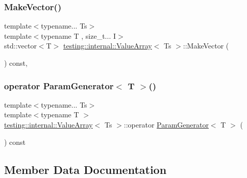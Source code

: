 \subsubsection{\texorpdfstring{Make\+Vector()}{MakeVector()}}
{\footnotesize\ttfamily template$<$typename... Ts$>$ \\
template$<$typename T , size\+\_\+t... I$>$ \\
std\+::vector$<$T$>$ \hyperlink{classtesting_1_1internal_1_1ValueArray}{testing\+::internal\+::\+Value\+Array}$<$ Ts $>$\+::Make\+Vector (\begin{DoxyParamCaption}\item[{\hyperlink{structtesting_1_1internal_1_1IndexSequence}{Index\+Sequence}$<$ I... $>$}]{ }\end{DoxyParamCaption}) const\hspace{0.3cm}{\ttfamily [inline]}, {\ttfamily [private]}}

\mbox{\label{classtesting_1_1internal_1_1ValueArray_a019560f10debdce5f47bb18c0e5261b5}} 
\subsubsection{\texorpdfstring{operator Param\+Generator$<$ T $>$()}{operator ParamGenerator< T >()}}
{\footnotesize\ttfamily template$<$typename... Ts$>$ \\
template$<$typename T $>$ \\
\hyperlink{classtesting_1_1internal_1_1ValueArray}{testing\+::internal\+::\+Value\+Array}$<$ Ts $>$\+::operator \hyperlink{classtesting_1_1internal_1_1ParamGenerator}{Param\+Generator}$<$ T $>$ (\begin{DoxyParamCaption}{ }\end{DoxyParamCaption}) const\hspace{0.3cm}{\ttfamily [inline]}}



\subsection{Member Data Documentation}
\mbox{\label{classtesting_1_1internal_1_1ValueArray_a13322bd870795fdd18dde7f95c4cedb0}} 
